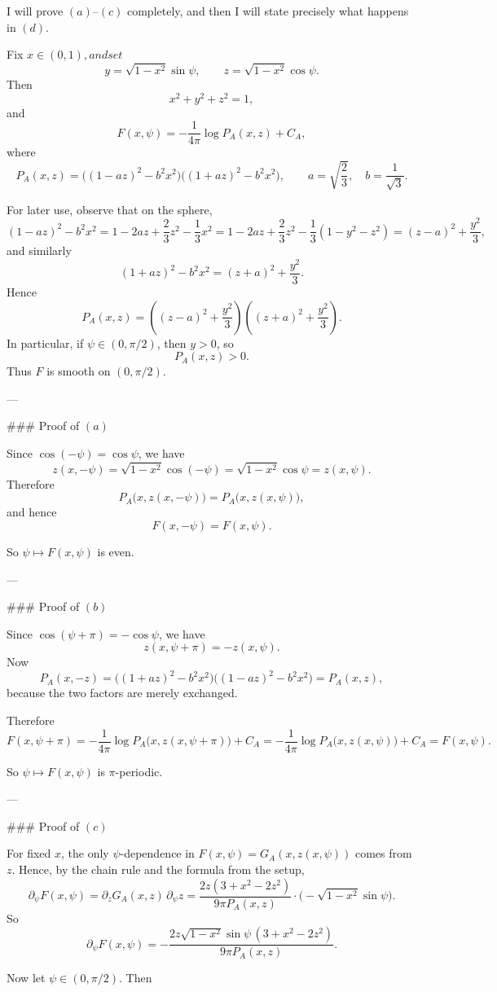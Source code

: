 I will prove $(a)$–$(c)$ completely, and then I will state precisely what happens in $(d)$.

Fix $x\in(0,1)$$, and set$
\[
y=\sqrt{1-x^2}\sin\psi,\qquad z=\sqrt{1-x^2}\cos\psi.
\]
Then
\[
x^2+y^2+z^2=1,
\]
and
\[
F(x,\psi)= -\frac{1}{4\pi}\log P_A(x,z)+C_A,
\]
where
\[
P_A(x,z)=\bigl((1-az)^2-b^2x^2\bigr)\bigl((1+az)^2-b^2x^2\bigr),
\qquad
a=\sqrt{\frac23},\quad b=\frac1{\sqrt3}.
\]

For later use, observe that on the sphere,
\[
(1-az)^2-b^2x^2
=1-2az+\frac23 z^2-\frac13x^2
=1-2az+\frac23 z^2-\frac13(1-y^2-z^2)
=(z-a)^2+\frac{y^2}{3},
\]
and similarly
\[
(1+az)^2-b^2x^2=(z+a)^2+\frac{y^2}{3}.
\]
Hence
\[
P_A(x,z)=\left((z-a)^2+\frac{y^2}{3}\right)\left((z+a)^2+\frac{y^2}{3}\right).
\]
In particular, if $\psi\in(0,\pi/2)$, then $y>0$, so
\[
P_A(x,z)>0.
\]
Thus $F$ is smooth on $(0,\pi/2)$.

---

### Proof of $(a)$

Since $\cos(-\psi)=\cos\psi$, we have
\[
z(x,-\psi)=\sqrt{1-x^2}\cos(-\psi)=\sqrt{1-x^2}\cos\psi=z(x,\psi).
\]
Therefore
\[
P_A\bigl(x,z(x,-\psi)\bigr)=P_A\bigl(x,z(x,\psi)\bigr),
\]
and hence
\[
F(x,-\psi)=F(x,\psi).
\]

So $\psi\mapsto F(x,\psi)$ is even.

---

### Proof of $(b)$

Since $\cos(\psi+\pi)=-\cos\psi$, we have
\[
z(x,\psi+\pi)=-z(x,\psi).
\]
Now
\[
P_A(x,-z)
=\bigl((1+a z)^2-b^2x^2\bigr)\bigl((1-a z)^2-b^2x^2\bigr)
=P_A(x,z),
\]
because the two factors are merely exchanged.

Therefore
\[
F(x,\psi+\pi)
=-\frac{1}{4\pi}\log P_A\bigl(x,z(x,\psi+\pi)\bigr)+C_A
=-\frac{1}{4\pi}\log P_A\bigl(x,z(x,\psi)\bigr)+C_A
=F(x,\psi).
\]

So $\psi\mapsto F(x,\psi)$ is $\pi$-periodic.

---

### Proof of $(c)$

For fixed $x$, the only $\psi$-dependence in $F(x,\psi)=G_A(x,z(x,\psi))$ comes from $z$. Hence, by the chain rule and the formula from the setup,
\[
\partial_\psi F(x,\psi)
=\partial_z G_A(x,z)\,\partial_\psi z
=\frac{2z(3+x^2-2z^2)}{9\pi P_A(x,z)}\cdot\bigl(-\sqrt{1-x^2}\sin\psi\bigr).
\]
So
\[
\partial_\psi F(x,\psi)
=
-\frac{2z\sqrt{1-x^2}\sin\psi\,(3+x^2-2z^2)}{9\pi P_A(x,z)}.
\]

Now let $\psi\in(0,\pi/2)$. Then


